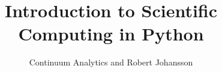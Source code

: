 \documentclass{report}
\title{Introduction to Scientific Computing in Python}
\author{Continuum Analytics and Robert Johansson}
\begin{document}
\renewcommand*\contentsname{\newline\newline Table of Contents}
\maketitle
\tableofcontents
\end{document}

